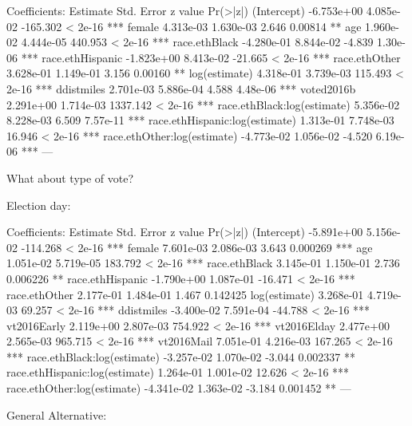 Coefficients:
                                 Estimate Std. Error  z value Pr(>|z|)    
(Intercept)                    -6.753e+00  4.085e-02 -165.302  < 2e-16 ***
female                          4.313e-03  1.630e-03    2.646  0.00814 ** 
age                             1.960e-02  4.444e-05  440.953  < 2e-16 ***
race.ethBlack                  -4.280e-01  8.844e-02   -4.839 1.30e-06 ***
race.ethHispanic               -1.823e+00  8.413e-02  -21.665  < 2e-16 ***
race.ethOther                   3.628e-01  1.149e-01    3.156  0.00160 ** 
log(estimate)                   4.318e-01  3.739e-03  115.493  < 2e-16 ***
ddistmiles                      2.701e-03  5.886e-04    4.588 4.48e-06 ***
voted2016b                      2.291e+00  1.714e-03 1337.142  < 2e-16 ***
race.ethBlack:log(estimate)     5.356e-02  8.228e-03    6.509 7.57e-11 ***
race.ethHispanic:log(estimate)  1.313e-01  7.748e-03   16.946  < 2e-16 ***
race.ethOther:log(estimate)    -4.773e-02  1.056e-02   -4.520 6.19e-06 ***
---




What about type of vote?

Election day: 

Coefficients:
                                 Estimate Std. Error  z value Pr(>|z|)    
(Intercept)                    -5.891e+00  5.156e-02 -114.268  < 2e-16 ***
female                          7.601e-03  2.086e-03    3.643 0.000269 ***
age                             1.051e-02  5.719e-05  183.792  < 2e-16 ***
race.ethBlack                   3.145e-01  1.150e-01    2.736 0.006226 ** 
race.ethHispanic               -1.790e+00  1.087e-01  -16.471  < 2e-16 ***
race.ethOther                   2.177e-01  1.484e-01    1.467 0.142425    
log(estimate)                   3.268e-01  4.719e-03   69.257  < 2e-16 ***
ddistmiles                     -3.400e-02  7.591e-04  -44.788  < 2e-16 ***
vt2016Early                     2.119e+00  2.807e-03  754.922  < 2e-16 ***
vt2016Elday                     2.477e+00  2.565e-03  965.715  < 2e-16 ***
vt2016Mail                      7.051e-01  4.216e-03  167.265  < 2e-16 ***
race.ethBlack:log(estimate)    -3.257e-02  1.070e-02   -3.044 0.002337 ** 
race.ethHispanic:log(estimate)  1.264e-01  1.001e-02   12.626  < 2e-16 ***
race.ethOther:log(estimate)    -4.341e-02  1.363e-02   -3.184 0.001452 ** 
---


General Alternative:

